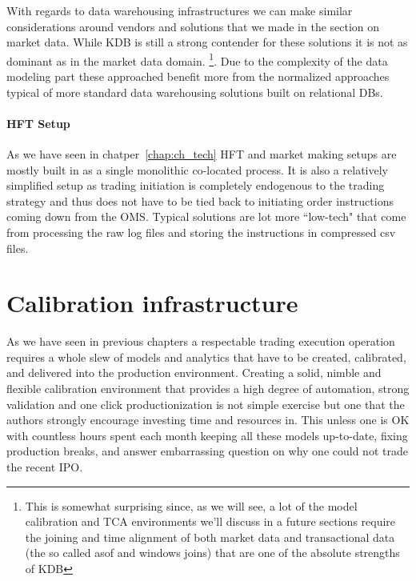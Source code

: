 With regards to data warehousing infrastructures we can make similar considerations around vendors and solutions that we made in the section on market data. While KDB is still a strong contender for these solutions it is not as dominant as in the market data domain. \footnote{This is somewhat surprising since, as we will see, a lot of the model calibration and TCA environments we'll discuss in a future sections require the joining and time alignment of both market data and transactional data (the so called asof and windows joins) that are one of the absolute strengths of KDB}. Due to the  complexity of the data modeling part these approached benefit more from the normalized approaches typical of more standard data warehousing solutions built on relational DBs. 

\paragraph{HFT Setup}
As we have seen in chatper~\ref{chap:ch_tech} HFT and market making setups are mostly built in as a single monolithic co-located process. It is also a relatively simplified setup as trading initiation is completely endogenous to the trading strategy and thus does not have to be tied back to initiating order instructions coming down from the OMS. Typical solutions are  lot more ``low-tech" that come from processing the raw log files and storing the instructions in compressed csv files.

\section{Calibration infrastructure}
As we have seen in previous chapters a respectable trading execution operation requires a whole slew of models and analytics that have to be created, calibrated, and delivered into the production environment. Creating a solid, nimble and flexible calibration environment that provides a high degree of automation, strong validation and one click productionization is not  simple exercise but one that the authors strongly encourage investing time and resources in. This unless one is OK with countless hours spent each month keeping all these models up-to-date, fixing production breaks, and answer embarrassing question on why one could not trade the recent IPO. 

